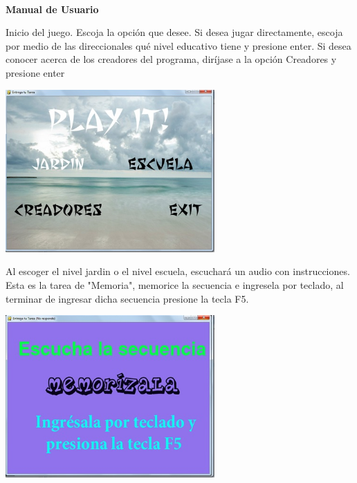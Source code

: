 \documentclass[12pt]{report}
\begin{document}
\newpage

\begin{center}
	\begingroup
		
		\Huge{\textbf{\\Manual de Usuario	\vspace{1em}}}

	\endgroup
\end{center}
Inicio del juego. Escoja la opción que desee. Si desea jugar directamente, escoja por medio de las direccionales qué nivel educativo tiene y presione enter. Si desea conocer acerca de los creadores del programa, diríjase a la opción Creadores y presione enter


	\begin{center}
		\begingroup
			\includegraphics[width=0.6\textwidth]{imagenes_usuario/inicio.jpg}
		\endgroup
	\end{center}



Al escoger el nivel jardin o el nivel escuela, escuchará un audio con instrucciones. Esta es la tarea de "Memoria", memorice la secuencia e ingresela por teclado, al terminar de ingresar dicha secuencia presione la tecla F5.

	\begin{center}
		\begingroup
			\includegraphics[width=0.6\textwidth]{imagenes_usuario/memoriza}
		\endgroup
	\end{center}
\end{document}
